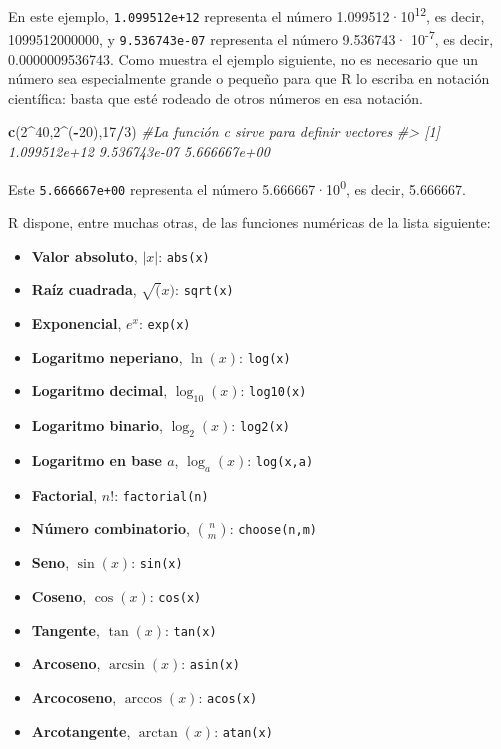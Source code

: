 \documentclass[
]{book}
\newenvironment{Shaded}{\begin{snugshade}}{\end{snugshade}}
\newcommand{\CommentTok}[1]{\textcolor[rgb]{0.56,0.35,0.01}{\textit{#1}}}
\newcommand{\DecValTok}[1]{\textcolor[rgb]{0.00,0.00,0.81}{#1}}
\newcommand{\KeywordTok}[1]{\textcolor[rgb]{0.13,0.29,0.53}{\textbf{#1}}}
\newcommand{\NormalTok}[1]{#1}
\newcommand{\OperatorTok}[1]{\textcolor[rgb]{0.81,0.36,0.00}{\textbf{#1}}}
\theoremstyle{definition}
\theoremstyle{definition}
\theoremstyle{definition}
\theoremstyle{remark}
\begin{document}
En este ejemplo, \texttt{1.099512e+12} representa el número 1.099512·10\textsuperscript{12}, es decir, 1099512000000, y \texttt{9.536743e-07} representa el número 9.536743· 10\textsuperscript{-7}, es decir,
0.0000009536743. Como muestra el ejemplo siguiente, no es necesario que un número sea especialmente grande o pequeño
para que R lo escriba en notación científica: basta que esté rodeado de otros números en esa notación.

\begin{Shaded}
\begin{Highlighting}[]
\KeywordTok{c}\NormalTok{(}\DecValTok{2}\OperatorTok{\^{}}\DecValTok{40}\NormalTok{,}\DecValTok{2}\OperatorTok{\^{}}\NormalTok{(}\OperatorTok{{-}}\DecValTok{20}\NormalTok{),}\DecValTok{17}\OperatorTok{/}\DecValTok{3}\NormalTok{) }\CommentTok{\#La función c sirve para definir vectores}
\CommentTok{\#\textgreater{} [1] 1.099512e+12 9.536743e{-}07 5.666667e+00}
\end{Highlighting}
\end{Shaded}

Este \texttt{5.666667e+00} representa el número 5.666667·10\textsuperscript{0}, es decir,
5.666667.

R dispone, entre muchas otras, de las funciones numéricas de la lista siguiente:

\begin{itemize}
\item
  \textbf{Valor absoluto}, \(|x|\): \texttt{abs(x)}
\item
  \textbf{Raíz cuadrada}, \(\sqrt(x)\): \texttt{sqrt(x)}
\item
  \textbf{Exponencial}, \(e^x\): \texttt{exp(x)}
\item
  \textbf{Logaritmo neperiano}, \(\ln(x)\): \texttt{log(x)}
\item
  \textbf{Logaritmo decimal}, \(\log_{10}(x)\): \texttt{log10(x)}
\item
  \textbf{Logaritmo binario}, \(\log_2(x)\): \texttt{log2(x)}
\item
  \textbf{Logaritmo en base \(a\)}, \(\log_a(x)\): \texttt{log(x,a)}
\item
  \textbf{Factorial}, \(n!\): \texttt{factorial(n)}
\item
  \textbf{Número combinatorio}, \(\binom{n}{m}\): \texttt{choose(n,m)}
\item
  \textbf{Seno}, \(\sin(x)\): \texttt{sin(x)}
\item
  \textbf{Coseno}, \(\cos(x)\): \texttt{cos(x)}
\item
  \textbf{Tangente}, \(\tan(x)\): \texttt{tan(x)}
\item
  \textbf{Arcoseno}, \(\arcsin(x)\): \texttt{asin(x)}
\item
  \textbf{Arcocoseno}, \(\arccos(x)\): \texttt{acos(x)}
\item
  \textbf{Arcotangente}, \(\arctan(x)\): \texttt{atan(x)}
\end{itemize}
\end{document}
